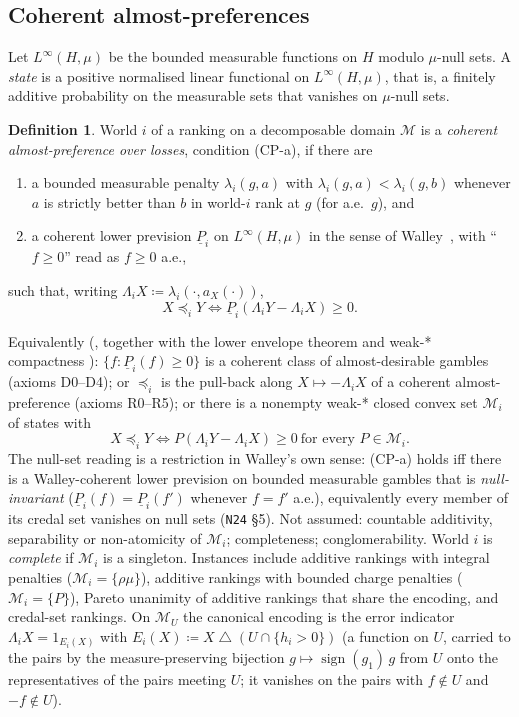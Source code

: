 \documentclass[11pt]{article}
\theoremstyle{definition}
\newtheorem{definition}[theorem]{Definition}
\theoremstyle{remark}
\newcommand{\M}{\mathcal M}
\newcommand{\sd}{\mathbin{\triangle}}
\newcommand{\lp}{\underline{P}}
\newcommand{\src}[1]{\texttt{#1}}
\begin{document}
\subsection{Coherent almost-preferences}\label{sec:CPa-def}
Let $L^\infty(H,\mu)$ be the bounded measurable functions on $H$ modulo $\mu$-null sets. A \emph{state} is a positive normalised linear functional on $L^\infty(H,\mu)$, that is, a finitely additive probability on the measurable sets that vanishes on $\mu$-null sets.

\begin{definition}\label{def:CPa}
World $i$ of a ranking on a decomposable domain $\M$ is a \emph{coherent almost-preference over losses}, condition (CP-a), if there are
\begin{enumerate}[leftmargin=*,label=(\roman*)]
\item a bounded measurable penalty $\lambda_i(g,a)$ with $\lambda_i(g,a)<\lambda_i(g,b)$ whenever $a$ is strictly better than $b$ in world-$i$ rank at $g$ (for a.e.\ $g$), and
\item a coherent lower prevision $\lp_i$ on $L^\infty(H,\mu)$ in the sense of Walley~\cite{W1991}, with ``$f\ge0$'' read as $f\ge0$ a.e.,
\end{enumerate}
such that, writing $\Lambda_iX\coloneqq\lambda_i(\cdot,a_X(\cdot))$,
\[
X\preceq_iY\iff\lp_i(\Lambda_iY-\Lambda_iX)\ge0 .
\]
\end{definition}
Equivalently (\cite[Thm.~3.8.1]{W1991}, together with the lower envelope theorem \cite[Thm.~3.3.3]{W1991} and weak-* compactness \cite[\S3.6]{W1991}): $\{f:\lp_i(f)\ge0\}$ is a coherent class of almost-desirable gambles (axioms D0--D4); or $\preceq_i$ is the pull-back along $X\mapsto-\Lambda_iX$ of a coherent almost-preference (axioms R0--R5); or there is a nonempty weak-* closed convex set $\M_i$ of states with
\[
X\preceq_iY\iff P(\Lambda_iY-\Lambda_iX)\ge0\ \text{for every }P\in\M_i .
\]
The null-set reading is a restriction in Walley's own sense: (CP-a) holds iff there is a Walley-coherent lower prevision on bounded measurable gambles that is \emph{null-invariant} ($\lp_i(f)=\lp_i(f')$ whenever $f=f'$ a.e.), equivalently every member of its credal set vanishes on null sets (\src{N24} \S5). Not assumed: countable additivity, separability or non-atomicity of $\M_i$; completeness; conglomerability. World $i$ is \emph{complete} if $\M_i$ is a singleton. Instances include additive rankings with integral penalties ($\M_i=\{\rho\mu\}$), additive rankings with bounded charge penalties ($\M_i=\{P\}$), Pareto unanimity of additive rankings that share the encoding, and credal-set rankings. On $\M_U$ the canonical encoding is the error indicator $\Lambda_iX=1_{E_i(X)}$ with $E_i(X)\coloneqq X\sd(U\cap\{h_i>0\})$ (a function on $U$, carried to the pairs by the measure-preserving bijection $g\mapsto\operatorname{sign}(g_1)\,g$ from $U$ onto the representatives of the pairs meeting $U$; it vanishes on the pairs with $f\notin U$ and $-f\notin U$).
\end{document}
